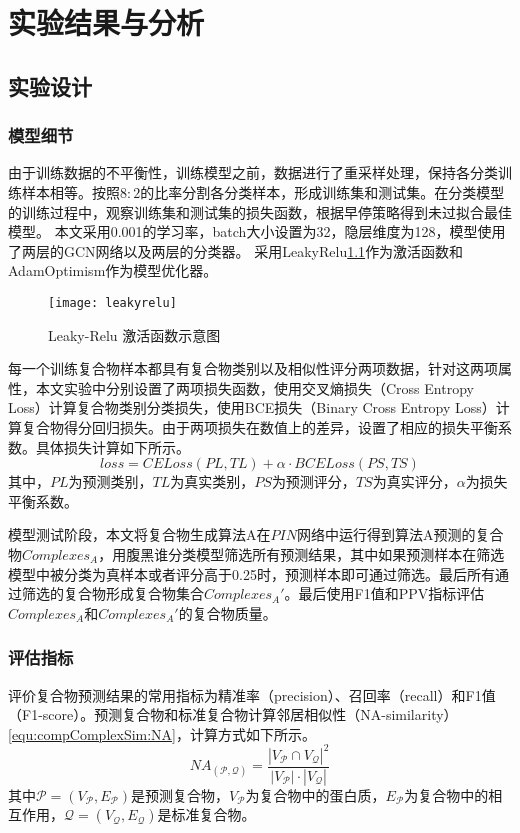 \chapter{实验结果与分析}
\label{chapter:resultAndOther}
\section{实验设计}
\label{section:workdesign}
\subsection{模型细节}
\label{subsection:trainModel}

由于训练数据的不平衡性，训练模型之前，数据进行了重采样处理，保持各分类训练样本相等。按照$8:2$的比率分割各分类样本，形成训练集和测试集。在分类模型的训练过程中，观察训练集和测试集的损失函数，根据早停策略得到未过拟合最佳模型。
本文采用0.001的学习率，batch大小设置为32，隐层维度为128，模型使用了两层的GCN网络以及两层的分类器。
采用LeakyRelu\ref{fig:leakyrelu}作为激活函数和AdamOptimism作为模型优化器。

\begin{figure}[htbp]
    \centering
    \texttt{[image: leakyrelu]}
    \caption{Leaky-Relu 激活函数示意图}
    \label{fig:leakyrelu}
\end{figure}

每一个训练复合物样本都具有复合物类别以及相似性评分两项数据，针对这两项属性，本文实验中分别设置了两项损失函数，使用交叉熵损失（Cross Entropy Loss）计算复合物类别分类损失，使用BCE损失（Binary Cross Entropy Loss）计算复合物得分回归损失。由于两项损失在数值上的差异，设置了相应的损失平衡系数。具体损失计算如下所示。
\begin{equation}
    \label{equ:loss}
    loss=CELoss(PL,TL)+\alpha \cdot BCELoss(PS,TS)
\end{equation}
其中，$PL$为预测类别，$TL$为真实类别，$PS$为预测评分，$TS$为真实评分，$\alpha$为损失平衡系数。

模型测试阶段，本文将复合物生成算法A在$PIN$网络中运行得到算法A预测的复合物$Complexes_A$，用腹黑谁分类模型筛选所有预测结果，其中如果预测样本在筛选模型中被分类为真样本或者评分高于0.25时，预测样本即可通过筛选。最后所有通过筛选的复合物形成复合物集合$Complexes_A'$。最后使用F1值和PPV指标评估$Complexes_A$和$Complexes_A'$的复合物质量。
\subsection{评估指标}
\label{subsection:netrix}
评价复合物预测结果的常用指标为精准率（precision）、召回率（recall）和F1值（F1-score）。预测复合物和标准复合物计算邻居相似性（NA-similarity）\ref{equ:compComplexSim:NA}，计算方式如下所示。
\begin{equation}
    \label{equ:compComplexSim:NA}
    NA_{(\mathcal{P} ,\mathcal{Q} )} = \frac{{\left\lvert V_{\mathcal{P}} \cap V_{\mathcal{Q}}\right\rvert}^2 }{{\left\lvert V_{\mathcal{P}} \right\rvert}\cdot  {\left\lvert V_{\mathcal{Q}} \right\rvert}}
\end{equation}
其中$\mathcal{P}=(V_{\mathcal{P}} ,E_{\mathcal{P}})$是预测复合物，$V_{\mathcal{P}}$为复合物中的蛋白质，$E_{\mathcal{P}}$为复合物中的相互作用，$\mathcal{Q}=(V_{\mathcal{Q}} ,E_{\mathcal{Q}})$是标准复合物。

